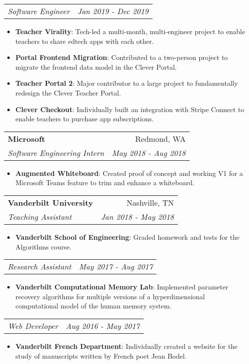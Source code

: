 \documentclass[letterpaper,11pt]{article}
\makeatletter
\newcommand{\boldedItem}[2]{
  \item\small{
    \textbf{#1}{: #2 
    \vspace{-5pt}
    }
  }
}
\newcommand{\resumeSubheading}[4]{
    \begin{tabular*}{0.97\textwidth}{l@{\extracolsep{\fill}}r}
      \textbf{\Large#1} & #2 \\
      \textit{#3} & \textit{#4} \\
    \end{tabular*}
    \vspace{-3pt}
}
\newcommand{\resumeRole}[2]{
  \begin{tabular*}{0.97\textwidth}{l@{\extracolsep{\fill}}r}
    \textit{#1} & \textit{#2} \\
  \end{tabular*}
  \vspace{-3pt}
}
\newcommand{\resumeSubItem}[2]{\boldedItem{#1}{#2}\vspace{-4pt}}
\newcommand{\resumeSubHeadingListStart}{\begin{itemize}[leftmargin=*]}
\newcommand{\resumeSubHeadingListEnd}{\end{itemize}}
\newcommand{\resumeItemListStart}{\begin{itemize}}
\newcommand{\resumeItemListEnd}{
  \end{itemize}
}
\makeatother
\begin{document}
      \resumeRole
        {Software Engineer}{Jan 2019 - Dec 2019}
        \resumeItemListStart
          \boldedItem{Teacher Virality}
            {Tech-led a multi-month, multi-engineer project to enable teachers to share edtech apps with each other.}
          \boldedItem{Portal Frontend Migration}
            {Contributed to a two-person project to migrate the frontend data model in the Clever Portal.}
          \boldedItem{Teacher Portal 2}
            {Major contributor to a large project to fundamentally redesign the Clever Teacher Portal.}
          \boldedItem{Clever Checkout}
            {Individually built an integration with Stripe Connect to enable teachers to purchase app subscriptions.}
        \resumeItemListEnd

    \vspace{20pt}

    \resumeSubheading
      {Microsoft}{Redmond, WA}
      {Software Engineering Intern}{May 2018 - Aug 2018}
      \resumeItemListStart
        \boldedItem{Augmented Whiteboard}
          {Created proof of concept and working V1 for a Microsoft Teams feature to trim and enhance a whiteboard.}
      \resumeItemListEnd

    \vspace{20pt}

    \resumeSubheading
      {Vanderbilt University }{Nashville, TN}
      {Teaching Assistant}{Jan 2018 - May 2018}
      \resumeItemListStart
        \boldedItem{Vanderbilt School of Engineering}
          {Graded homework and tests for the Algorithms course.}
      \resumeItemListEnd
      \resumeRole
        {Research Assistant}{May 2017 - Aug 2017}
        \resumeItemListStart
          \boldedItem{Vanderbilt Computational Memory Lab}
            {Implemented parameter recovery algorithms for multiple versions of a hyperdimensional computational model of the human memory system.}
        \resumeItemListEnd
      \resumeRole
        {Web Developer}{Aug 2016 - May 2017}
        \resumeItemListStart
          \boldedItem{Vanderbilt French Department}
            {Individually created a website for the study of manuscripts written by French poet Jean Bodel.}
        \resumeItemListEnd



\end{document}
